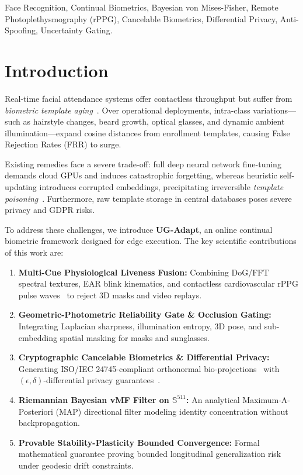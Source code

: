 \documentclass[conference]{IEEEtran}
\begin{document}
\begin{IEEEkeywords}
Face Recognition, Continual Biometrics, Bayesian von Mises-Fisher, Remote Photoplethysmography (rPPG), Cancelable Biometrics, Differential Privacy, Anti-Spoofing, Uncertainty Gating.
\end{IEEEkeywords}

\section{Introduction}
Real-time facial attendance systems offer contactless throughput but suffer from \textit{biometric template aging}~\cite{rattani2013adaptive}. Over operational deployments, intra-class variations—such as hairstyle changes, beard growth, optical glasses, and dynamic ambient illumination—expand cosine distances from enrollment templates, causing False Rejection Rates (FRR) to surge.

Existing remedies face a severe trade-off: full deep neural network fine-tuning~\cite{parisi2019continual} demands cloud GPUs and induces catastrophic forgetting, whereas heuristic self-updating introduces corrupted embeddings, precipitating irreversible \textit{template poisoning}~\cite{scherhag2019biometric}. Furthermore, raw template storage in central databases poses severe privacy and GDPR risks.

To address these challenges, we introduce \textbf{UG-Adapt}, an online continual biometric framework designed for edge execution. The key scientific contributions of this work are:
\begin{enumerate}
    \item \textbf{Multi-Cue Physiological Liveness Fusion:} Combining DoG/FFT spectral textures, EAR blink kinematics, and contactless cardiovascular rPPG pulse waves~\cite{dehaan2013chrom} to reject 3D masks and video replays.
    \item \textbf{Geometric-Photometric Reliability Gate \& Occlusion Gating:} Integrating Laplacian sharpness, illumination entropy, 3D pose, and sub-embedding spatial masking for masks and sunglasses.
    \item \textbf{Cryptographic Cancelable Biometrics \& Differential Privacy:} Generating ISO/IEC 24745-compliant orthonormal bio-projections~\cite{patel2015cancelable} with $(\epsilon, \delta)$-differential privacy guarantees~\cite{dwork2014algorithmic}.
    \item \textbf{Riemannian Bayesian vMF Filter on $\mathbb{S}^{511}$:} An analytical Maximum-A-Posteriori (MAP) directional filter modeling identity concentration without backpropagation.
    \item \textbf{Provable Stability-Plasticity Bounded Convergence:} Formal mathematical guarantee proving bounded longitudinal generalization risk under geodesic drift constraints.
\end{enumerate}
\end{document}
